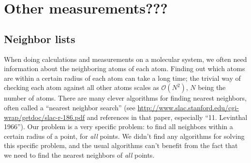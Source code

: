 \chapter{Other measurements???}
\section{Neighbor lists\label{sec:neighbor_lists}}
When doing calculations and measurements on a molecular system, we often need information about the neighboring atoms of each atom. Finding out which atoms are within a certain radius of each atom can take a long time; the trivial way of checking each atom against all other atoms scales as $\mathcal{O}(N^2)$, $N$ being the number of atoms. There are many clever algorithms for finding nearest neighbors, often called a ``nearest neighbor search'' (see \url{http://www.slac.stanford.edu/cgi-wrap/getdoc/slac-r-186.pdf} and references in that paper, especially ``11. Levinthal 1966''). Our problem is a very specific problem: to find all neighbors within a certain radius of a point, for \emph{all} points. We didn't find any algorithms for solving this specific problem, and the usual algorithms can't benefit from the fact that we need to find the nearest neighbors of \emph{all} points.

